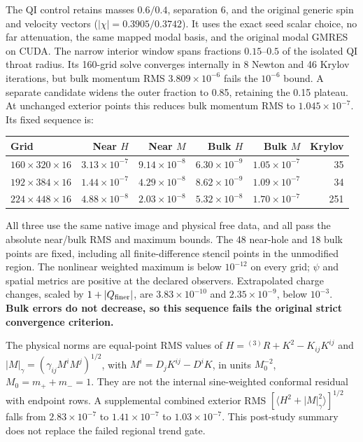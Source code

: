 \documentclass[aps,prd,preprint,notitlepage,nofootinbib]{revtex4-2}
\begin{document}
The QI control retains masses $0.6/0.4$, separation 6, and the original generic
spin and velocity vectors ($|\chi|=0.3905/0.3742$). It uses the exact seed scalar
choice, no far attenuation, the same mapped modal basis, and the original
modal GMRES on CUDA. The narrow interior window spans fractions $0.15$--$0.5$ of
the isolated QI throat radius. Its 160-grid solve converges internally in
8 Newton and 46 Krylov iterations, but bulk momentum RMS $3.809\times10^{-6}$ fails the
$10^{-6}$ bound. A separate candidate widens the outer fraction to 0.85,
retaining the 0.15 plateau. At unchanged exterior points this reduces bulk
momentum RMS to $1.045\times10^{-7}$. Its fixed sequence is:
\begin{center}\footnotesize
\begin{tabular}{@{}lrrrrr@{}}
\toprule
Grid & Near $H$ & Near $M$ & Bulk $H$ & Bulk $M$ & Krylov\\\midrule
$160\times320\times16$ & $3.13\times10^{-7}$ & $9.14\times10^{-8}$ & $6.30\times10^{-9}$ & $1.05\times10^{-7}$ &35\\
$192\times384\times16$ & $1.44\times10^{-7}$ & $4.29\times10^{-8}$ & $8.62\times10^{-9}$ & $1.09\times10^{-7}$ &34\\
$224\times448\times16$ & $4.88\times10^{-8}$ & $2.03\times10^{-8}$ & $5.32\times10^{-8}$ & $1.70\times10^{-7}$ &251\\
\bottomrule
\end{tabular}
\end{center}
All three use the same native image and physical free data, and all pass the
absolute near/bulk RMS and maximum bounds. The 48 near-hole and 18 bulk points are
fixed, including all finite-difference stencil points in the unmodified region.
The nonlinear weighted maximum is below $10^{-12}$ on every grid; $\psi$ and
spatial metrics are positive at the declared observers. Extrapolated charge
changes, scaled by $1+|Q_{\rm finer}|$, are $3.83\times10^{-10}$ and
$2.35\times10^{-9}$, below $10^{-3}$. \textbf{Bulk errors do not decrease, so
this sequence fails the original strict convergence criterion.}

The physical norms are equal-point RMS values of
$H={}^{(3)}R+K^2-K_{ij}K^{ij}$ and
$|M|_\gamma=(\gamma_{ij}M^iM^j)^{1/2}$, with
$M^i=D_jK^{ij}-D^iK$, in units $M_0^{-2}$, $M_0=m_++m_-=1$.
They are not the internal sine-weighted conformal residual with endpoint
rows. A supplemental combined exterior RMS
$[\langle H^2+|M|_\gamma^2\rangle]^{1/2}$ falls from
$2.83\times10^{-7}$ to $1.41\times10^{-7}$ to $1.03\times10^{-7}$.
This post-study summary does not replace the failed regional trend gate.
\end{document}
